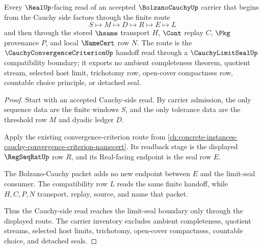 \begin{theorem}
\label{thm:bolzano-cauchy-cauchy-to-limit-route}
Every $\RealUp$-facing read of an accepted $\BolzanoCauchyUp$ carrier that begins from the Cauchy side factors through the finite route
$$
S \longmapsto M \longmapsto D \longmapsto R \longmapsto E \longmapsto L
$$
and then through the stored $\hsame$ transport $H$, $\Cont$ replay $C$, $\Pkg$ provenance $P$, and local $\NameCert$ row $N$. The route is the $\CauchyConvergenceCriterionUp$ handoff read through a $\CauchyLimitSealUp$ compatibility boundary; it exports no ambient completeness theorem, quotient stream, selected host limit, trichotomy row, open-cover compactness row, countable choice principle, or detached seal.
\end{theorem}
\begin{proof}
Start with an accepted Cauchy-side read. By carrier admission, the only sequence data are the finite windows $S$, and the only tolerance data are the threshold row $M$ and dyadic ledger $D$.

Apply the existing convergence-criterion route from \autoref{ch:concrete-instances-cauchy-convergence-criterion-namecert}. Its readback stage is the displayed $\RegSeqRatUp$ row $R$, and its Real-facing endpoint is the seal row $E$.

The Bolzano-Cauchy packet adds no new endpoint between $E$ and the limit-seal consumer. The compatibility row $L$ reads the same finite handoff, while $H,C,P,N$ transport, replay, source, and name that packet.

Thus the Cauchy-side read reaches the limit-seal boundary only through the displayed route. The carrier inventory excludes ambient completeness, quotient streams, selected host limits, trichotomy, open-cover compactness, countable choice, and detached seals.
\end{proof}

